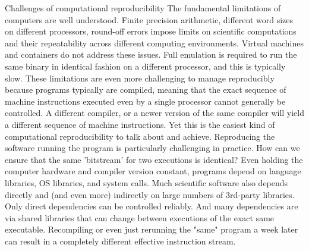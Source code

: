 		Challenges of computational reproducibility
			The fundamental limitations of computers are well understood.
				Finite precision arithmetic, different word sizes on different processors, round-off errors impose limits on scientific computations and 
					their repeatability across different computing environments.
				Virtual machines and containers do not address these issues. Full emulation is required to run the same binary in identical fashion
					on a different processor, and this is typically slow.
				These limitations are even more challenging to manage reproducibly because programs typically are compiled, meaning that the
					exact sequence of machine instructions executed even by a single processor cannot generally be controlled.  A different compiler,
					or a newer version of the same compiler will yield a different sequence of machine instructions.
				Yet this is the easiest kind of computational reproducibility to talk about and achieve.
			Reproducing the software running the program is particularly challenging in practice.
				How can we ensure that the same 'bitstream' for two executions is identical?
				Even holding the computer hardware and compiler version constant, programs depend on language libraries, OS libraries, and system calls.
				Much scientific software also depends directly and (and even more) indirectly on large numbers of 3rd-party libraries.
				Only direct dependencies can be controlled reliably.  And many dependencies are via shared libraries that can change between executions
				of the exact same executable.
				Recompiling or even just rerunning the "same" program a week later can result in a completely different effective instruction stream.
				